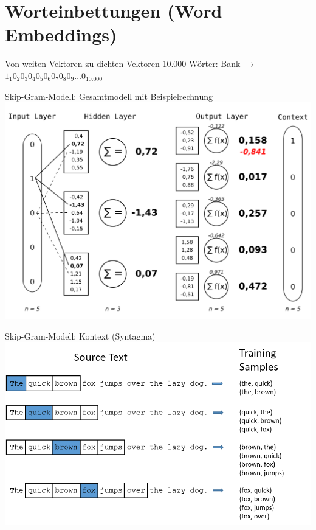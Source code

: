 \documentclass{beamer}
\begin{document}
\section{Worteinbettungen (Word Embeddings)}

\begin{frame}[c]{Von weiten Vektoren zu dichten Vektoren}
	10.000 Wörter: Bank $\rightarrow$ $1_1 0_2 0_3 0_4 0_5 0_6 0_7 0_8 0_9 \ldots 0_{10.000}$
	
\end{frame}

\begin{frame}[c]{Skip-Gram-Modell: Gesamtmodell mit Beispielrechnung}
	\includegraphics[scale=0.13]{"../pics/word2vec_skipgram_graphics.png"}
\end{frame}

\begin{frame}[c]{Skip-Gram-Modell: Kontext (Syntagma)}
	\includegraphics[scale=0.8]{"../pics/training_data_context.png"}
\end{frame}
\end{document}
